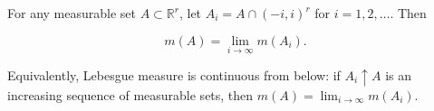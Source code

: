 \begin{theorem}[Theorem 3.17]
For any measurable set $A \subset \mathbb{R}^r$, let $A_i = A \cap (-i, i)^r$ for $i = 1, 2, \ldots$. Then

$$
m(A) = \lim_{i \to \infty} m(A_i).
$$

Equivalently, Lebesgue measure is continuous from below: if $A_i \uparrow A$ is an increasing sequence of measurable sets, then $m(A) = \lim_{i \to \infty} m(A_i)$.
\end{theorem}
